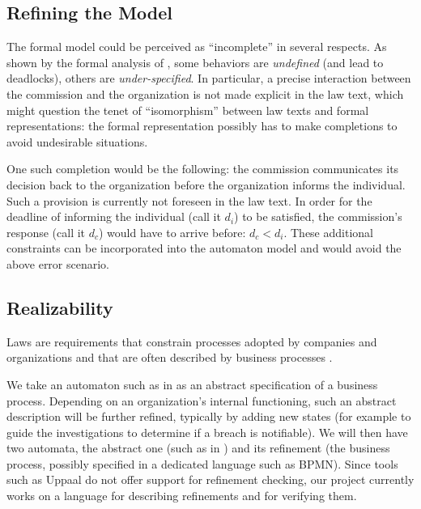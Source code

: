 \subsection{Refining the Model}\label{sec:refining_model}

The formal model could be perceived as ``incomplete'' in several respects. As
shown by the formal analysis of , some behaviors
are \emph{ undefined} (and lead to deadlocks), others are
\emph{under-specified}. In particular, a precise interaction between the
commission and the organization is not made explicit in the law text, which
might question the tenet of ``isomorphism''
\cite{bench_capon_gordon_isomorphism_2009} between law texts and formal
representations: the formal representation possibly has to make completions to
avoid undesirable situations.

One such completion would be the following: the commission communicates its
decision back to the organization before the organization informs the
individual. Such a provision is currently not foreseen in the law text. In
order for the deadline of informing the individual (call it $d_i$) to be
satisfied, the commission's response (call it $d_c$) would have to arrive
before: $d_c < d_i$. These additional constraints can be incorporated into the
automaton model and would avoid the above error scenario.


\subsection{Realizability}\label{sec:realizability}

Laws are requirements that constrain processes adopted by companies and
organizations and that are often described by business processes
\cite{aalst_business_provess_management_comprehensive_survey_2013}.

We take an automaton such as in  as an abstract
specification of a business process. Depending on an organization's internal
functioning, such an abstract description will be further refined, typically
by adding new states (for example to guide the investigations to determine if
a breach is notifiable). We will then have two automata, the abstract one
(such as in ) and its refinement (the business
process, possibly specified in a dedicated language such as BPMN). Since tools such
as Uppaal do not offer support for refinement checking, our project currently
works on a language for describing refinements and for verifying them.

